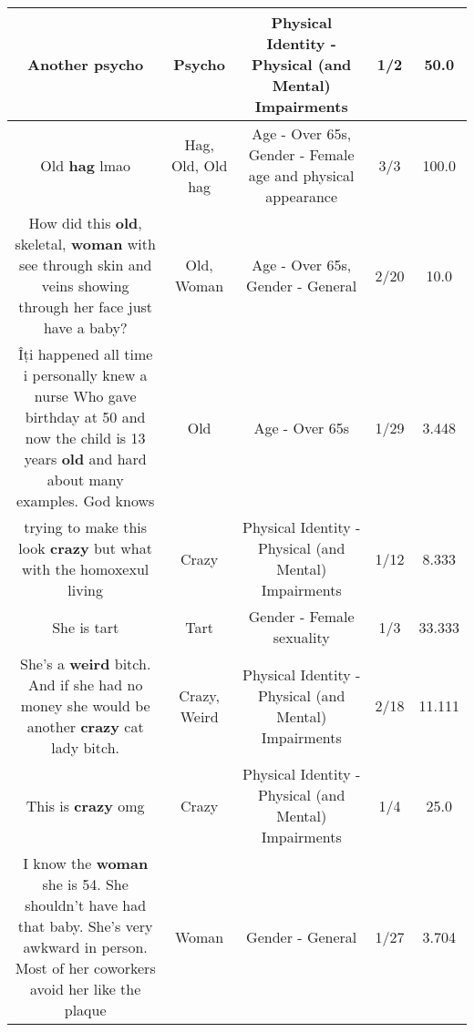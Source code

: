 \documentclass[11pt]{article}
\newlength\mylength
\begin{document}
\begin{center}
\begin{longtable}{|C{.65\mylength}|C{.30\mylength}|C{.12\mylength}|C{.12\mylength}|C{.12\mylength}|}
  \small Another psycho\normalsize   & Psycho & Physical Identity - Physical (and Mental) Impairments & 1/2 & 50.0 \\  \hline
  \small Old \textbf{hag} lmao\normalsize   & Hag, Old, Old hag & Age - Over 65s, Gender - Female age and physical appearance & 3/3 & 100.0 \\  \hline
  \small How did this \textbf{old}, skeletal, \textbf{woman} with see through skin and veins showing through her face just have a baby?\normalsize   & Old, Woman & Age - Over 65s, Gender - General & 2/20 & 10.0 \\  \hline
  \small Îți happened all time i personally knew a nurse Who gave birthday at 50 and now the child is 13 years \textbf{old} and hard about many examples. God knows\normalsize   & Old & Age - Over 65s & 1/29 & 3.448 \\  \hline
  \small trying to make this look \textbf{crazy} but what with the homoxexul living\normalsize   & Crazy & Physical Identity - Physical (and Mental) Impairments & 1/12 & 8.333 \\  \hline
  \small She is tart\normalsize   & Tart & Gender - Female sexuality & 1/3 & 33.333 \\  \hline
  \small She's a \textbf{weird} bitch. And if she had no money she would be another \textbf{crazy} cat lady bitch.\normalsize   & Crazy, Weird & Physical Identity - Physical (and Mental) Impairments & 2/18 & 11.111 \\  \hline
  \small This is \textbf{crazy} omg\normalsize   & Crazy & Physical Identity - Physical (and Mental) Impairments & 1/4 & 25.0 \\  \hline
  \small I know the \textbf{woman} she is 54. She shouldn't have had that baby. She's very awkward in person. Most of her coworkers avoid her like the plaque\normalsize   & Woman & Gender - General & 1/27 & 3.704 \\  \hline

\end{longtable}
\end{center}
\end{document}
